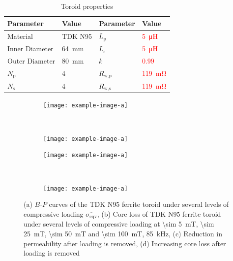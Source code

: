 \documentclass[conference]{IEEEtran}
\begin{document}
\begin{table}
  \centering
  \caption{Toroid properties}
  \begin{tabular}{@{}llll@{}}
    \toprule
    Parameter & Value & Parameter & Value \\ \midrule
    Material & TDK N95 & $L_\text{p}$ & \textcolor{red}{\SI{5}{\micro\henry}} \\
    Inner Diameter & \SI{64}{\milli\meter} & $L_\text{s}$ & \textcolor{red}{\SI{5}{\micro\henry}} \\
    Outer Diameter & \SI{80}{\milli\meter} & $k$ & \textcolor{red}{$0.99$} \\
    $N_\text{p}$ & 4 & $R_\text{w,p}$ & \textcolor{red}{\SI{119}{\milli\ohm}} \\
    $N_\text{s}$ & 4 & $R_\text{w,s}$ & \textcolor{red}{\SI{119}{\milli\ohm}} \\
    \bottomrule
  \end{tabular}
  \label{tab:toroidproperties}
\end{table}
\begin{figure}[t]
  \centering
  \begin{subfigure}{\columnwidth}
    \centering
    \texttt{[image: example-image-a]}
    \caption{}
    \label{fig:BPcurves}
  \end{subfigure}~
  \begin{subfigure}{\columnwidth}
    \centering
    \texttt{[image: example-image-a]}
    \caption{}
    \label{fig:corelossstress}
  \end{subfigure}

  \begin{subfigure}{\columnwidth}
    \centering
    \texttt{[image: example-image-a]}
    \caption{}
    \label{fig:BPcurves}
  \end{subfigure}~
  \begin{subfigure}{\columnwidth}
    \centering
    \texttt{[image: example-image-a]}
    \caption{}
    \label{fig:corelossstress}
  \end{subfigure}
  \caption{(a) $B$-$P$ curves of the TDK N95 ferrite toroid under several levels of compressive loading $\overline{\sigma_\text{eqv}}$, (b) Core loss of TDK N95 ferrite toroid under several levels of compressive loading at \SI{\sim 5}{\milli\tesla}, \SI{\sim 25}{\milli\tesla}, \SI{\sim 50}{\milli\tesla} and \SI{\sim 100}{\milli\tesla}, \SI{85}{\kilo\hertz}, (c) Reduction in permeability after loading is removed, (d) Increasing core loss after loading is removed}
\end{figure}
\end{document}
